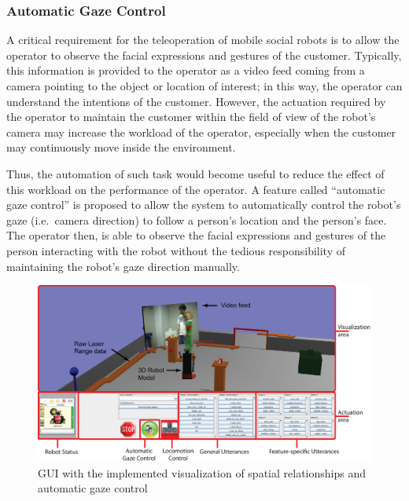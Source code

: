 \documentclass[a4paper, 10pt, conference]{ieeeconf}     %
\begin{document}
\subsubsection{Automatic Gaze Control}
A critical requirement for the teleoperation of mobile social robots is to allow the operator to observe the facial expressions and gestures of the customer.
Typically, this information is provided to the operator as a video feed coming from a camera pointing to the object or location of interest; in this way, the operator can understand the intentions of the customer.
However, the actuation required by the operator to maintain the customer within the field of view of the robot's camera may increase the workload of the operator, especially when the customer may continuously move inside the environment.
 

Thus, the automation of such task would become useful to reduce the effect of this workload on the performance of the operator.
A feature called ``automatic gaze control'' is proposed to allow the system to automatically control the robot's gaze (i.e.\ camera direction) to follow a person's location and the person's face. 
The operator then, is able to observe the facial expressions and gestures of the person interacting with the robot without the tedious responsibility of maintaining the robot's gaze direction manually.
\begin{figure}[htp] \centering
\includegraphics[width=2\columnwidth]{figs/fullFeatureGUIFinal_2.eps}
	\caption{GUI with the implemented visualization of spatial relationships and automatic gaze control}
	\label{fig:fullFeatureGUI}
\end{figure}
\end{document}
